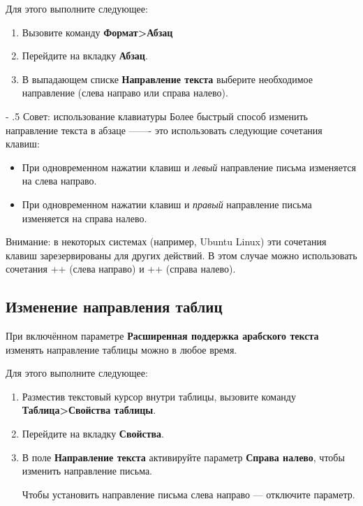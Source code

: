 ﻿\documentclass[a4paper,10pt]{article}
\makeatletter
\renewcommand\paragraph{%
   \@startsection{paragraph}{4}{0mm}%
      {-\baselineskip}%
      {.5\baselineskip}%
      {\normalfont\normalsize\bfseries}}
\makeatother
\begin{document}
 Для этого выполните следующее:
 
 \begin{enumerate}
  \item Вызовите команду \textbf{Формат>Абзац}
  \item Перейдите на вкладку \textbf{Абзац}.
  \item В выпадающем списке \textbf{Направление текста} выберите необходимое направление (слева направо или справа налево).
 \end{enumerate}

 \paragraph{Совет: использование клавиатуры}
 Более быстрый способ изменить направление текста в абзаце ——- это использовать следующие сочетания клавиш:
 \begin{itemize}
  \item При одновременном нажатии клавиш  и \textit{левый}  направление письма изменяется на слева направо.
  \item При одновременном нажатии клавиш  и \textit{правый}  направление письма изменяется на справа налево.
 \end{itemize}

 Внимание: в некоторых системах (например, Ubuntu Linux) эти сочетания клавиш зарезервированы для других действий. В этом случае можно использовать сочетания ++ (слева направо) и ++ (справа налево).
 
 \subsection{Изменение направления таблиц}
 При включённом параметре \textbf{Расширенная поддержка арабского текста} изменять направление таблицы можно в любое время.
 
 Для этого выполните следующее:
 \begin{enumerate}
  \item Разместив текстовый курсор внутри таблицы, вызовите команду \textbf{Таблица>Свойства таблицы}.
  \item Перейдите на вкладку \textbf{Свойства}.
  \item В поле \textbf{Направление текста} активируйте параметр \textbf{Справа налево}, чтобы изменить направление письма.
  
  Чтобы установить направление письма слева направо — отключите параметр.
 \end{enumerate}
\end{document}
